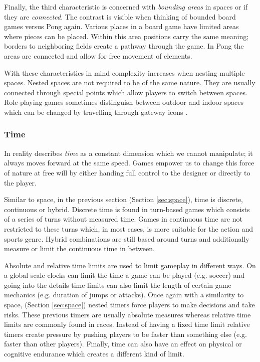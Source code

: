 Finally, the third characteristic is concerned with \textit{bounding areas} in spaces or if they are \textit{connected}.
The contrast is visible when thinking of bounded board games versus Pong again. 
Various places in a board game have limited areas where pieces can be placed.
Within this area positions carry the same meaning; borders to neighboring fields create a pathway through the game.
In Pong the areas are connected and allow for free movement of elements.

With these characteristics in mind complexity increases when nesting multiple spaces.
Nested spaces are not required to be of the same nature.
They are usually connected through special points which allow players to switch between spaces.
Role-playing games sometimes distinguish between outdoor and indoor spaces which can be changed by travelling through gateway icons \cite{Schell2014}.

\subsubsection{Time}
In reality \citeauthor{Schell2014} describes \textit{time} as a constant dimension which we cannot manipulate; it always moves forward at the same speed. 
Games empower us to change this force of nature at free will by either handing full control to the designer or directly to the player.

Similar to space, in the previous section (Section \ref{sec:space}), time is discrete, continuous or hybrid. Discrete time is found in turn-based games which consists of a series of turns without measured time.
Games in continuous time are not restricted to these turns which, in most cases, is more suitable for the action and sports genre.
Hybrid combinations are still based around turns and additionally measure or limit the continuous time in between.

Absolute and relative time limits are used to limit gameplay in different ways.
On a global scale clocks can limit the time a game can be played (e.g. soccer) and going into the details time limits can also limit the length of certain game mechanics (e.g. duration of jumps or attacks).
Once again with a similarity to space, (Section \ref{sec:space}) nested timers force players to make decisions and take risks.
These previous timers are usually absolute measures whereas relative time limits are commonly found in races.
Instead of having a fixed time limit relative timers create pressure by pushing players to be faster than something else (e.g. faster than other players).
Finally, time can also have an effect on physical or cognitive endurance which creates a different kind of limit.

